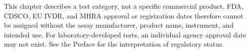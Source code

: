 This chapter describes a test category, not a specific commercial product. FDA, CDSCO, EU IVDR, and MHRA approval or registration dates therefore cannot be assigned without the assay manufacturer, product name, instrument, and intended use. For laboratory-developed tests, an individual agency approval date may not exist. See the Preface for the interpretation of regulatory status.
